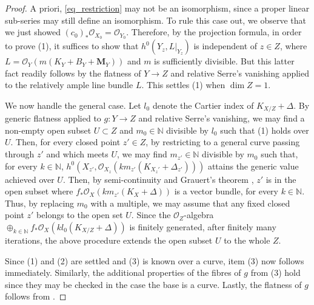 \documentclass[12pt]{amsart}
\theoremstyle{plain}
\theoremstyle{definition}
\def\dim{\operatorname{dim}}
\def\rar{\rightarrow}
\def\K#1.{K_{#1}}
\def\subs#1.{_{#1}}
\begin{document}
\begin{proof}
A priori, \eqref{eq_restriction} may not be an isomorphism, since a proper linear sub-series may still define an isomorphism.
To rule this case out, we observe that we just showed $(c_0)_* \mathcal{O}_{X_0}=\mathcal{O}_{Y_0}$.
Therefore, by the projection formula, in order to prove (1), it suffices to show that $h^0(Y_z,L|\subs Y_z. )$ is independent of $z \in Z$, where $L=\mathcal{O}_Y(m(K_Y+B_Y+\mathbf{M}_Y))$ and $m$ is sufficiently divisible.
But this latter fact readily follows by the flatness of $Y \to Z$ and relative Serre's vanishing applied to the relatively ample line bundle $L$.
This settles (1) when $\dim Z = 1$.


We now handle the general case.
Let $l_0$ denote the Cartier index of $\K X/Z. + \Delta$.
By generic flatness applied to $g \colon Y \rar Z$ and relative Serre's vanishing, we may find a non-empty 
open subset $U \subset Z$ and $m_0 \in \mathbb N$ divisible by $l_0$ such that (1) holds over $U$.
Then, for every closed point $z' \in Z$, by restricting to a general curve passing 
through $z'$ and which meets $U$, 
we may find $m_{z'} \in \mathbb N$ divisible by $m_0$ such that, 
for every $k \in \mathbb N$, $h^0(X_{z'},\mathcal{O}\subs X_z. (km_{z'}( \K X_z'. + \Delta_{z'})))$ 
attains the generic value achieved over $U$.
Then, by semi-continuity and Grauert's theorem \cite[Theorem III.12.8 and Corollary III.12.9]{Hartshorne77}, 
$z'$ is in the open subset where $f_*\mathcal{O}\subs X. (km_{z'}( \K X. + \Delta))$ is a vector bundle, 
for every $k \in \mathbb N$.
Thus, by replacing $m_0$ with a multiple, we may assume that any fixed closed point $z'$ belongs to the open set $U$.
Since the $\mathcal{O}_Z$-algebra $\oplus_{k \in \mathbb N}f_*\mathcal{O}_X(kl_0(\K X/Z.+\Delta))$ 
is finitely generated, after finitely many iterations, the above 
procedure extends the open subset $U$ to the whole $Z$.


Since (1) and (2) are settled and (3) is known over a curve, item (3) now follows immediately.
Similarly, the additional properties of the fibres of $g$ from (3) hold since they 
may be checked in the case the base is a curve.
Lastly, the flatness of $g$ follows from \cite[Theorem 3.20]{Kollar21}.
\end{proof}
\end{document}
